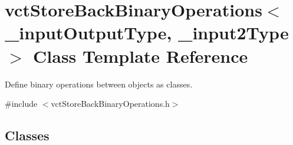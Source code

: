 \hypertarget{classvct_store_back_binary_operations}{\section{vct\-Store\-Back\-Binary\-Operations$<$ \-\_\-input\-Output\-Type, \-\_\-input2\-Type $>$ Class Template Reference}
\label{classvct_store_back_binary_operations}
}


Define binary operations between objects as classes.  




{\ttfamily \#include $<$vct\-Store\-Back\-Binary\-Operations.\-h$>$}

\subsection*{Classes}
